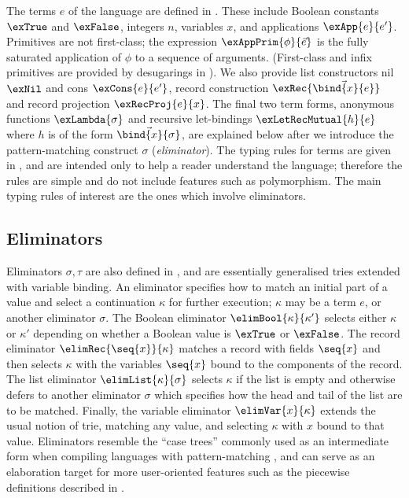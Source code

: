 The terms $e$ of the language are defined in . These include Boolean constants $\exTrue$ and $\exFalse$, integers $n$, variables $x$, and applications $\exApp{e}{e'}$. Primitives are not first-class; the expression $\exAppPrim{\phi}{\vec{e}}$ is the fully saturated application of $\phi$ to a sequence of arguments. (First-class and infix primitives are provided by desugarings in ). We also provide list constructors nil $\exNil$ and cons $\exCons{e}{e'}$, record construction $\exRec{\vec{\bind{x}{e}}}$ and record projection $\exRecProj{e}{x}$. The final two term forms, anonymous functions $\exLambda{\sigma}$ and recursive let-bindings $\exLetRecMutual{h}{e}$ where $h$ is of the form $\vec{\bind{x}{\sigma}}$, are explained below after we introduce the pattern-matching construct $\sigma$ (\emph{eliminator}). The typing rules for terms are given in , and are intended only to help a reader understand the language; therefore the rules are simple and do not include features such as polymorphism. The main typing rules of interest are the ones which involve eliminators.

\subsection{Eliminators}
\label{sec:core-language:syntax-eliminator}

Eliminators $\sigma, \tau$ are also defined in , and are essentially generalised tries \cite{connelly95,hinze00} extended with variable binding. An eliminator specifies how to match an initial part of a value and select a continuation $\kappa$ for further execution; $\kappa$ may be a term $e$, or another eliminator $\sigma$. The Boolean eliminator $\elimBool{\kappa}{\kappa'}$ selects either $\kappa$ or $\kappa'$ depending on whether a Boolean value is $\exTrue$ or $\exFalse$. The record eliminator $\elimRec{\seq{x}}{\kappa}$ matches a record with fields $\seq{x}$ and then selects $\kappa$ with the variables $\seq{x}$ bound to the components of the record. The list eliminator $\elimList{\kappa}{\sigma}$ selects $\kappa$ if the list is empty and otherwise defers to another eliminator $\sigma$ which specifies how the head and tail of the list are to be matched. Finally, the variable eliminator $\elimVar{x}{\kappa}$ extends the usual notion of trie, matching any value, and selecting $\kappa$ with $x$ bound to that value. Eliminators resemble the ``case trees'' commonly used as an intermediate form when compiling languages with pattern-matching \cite{graf20}, and can serve as an elaboration target for more user-oriented features such as the piecewise definitions described in .

